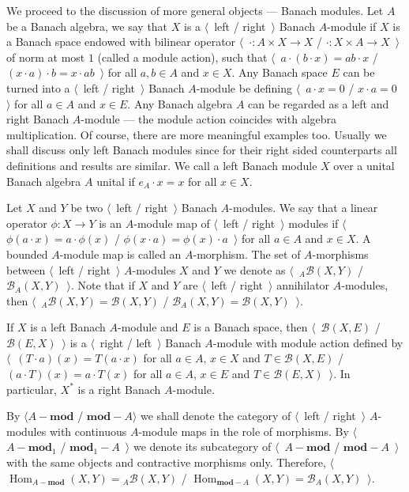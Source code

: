 We proceed to the discussion of more general objects --- Banach modules. Let $A$
be a Banach algebra, we say that $X$ is a $\langle$~left / right~$\rangle$
Banach $A$-module if $X$ is a Banach space endowed with bilinear operator
$\langle$~$\cdot:A\times X\to X$ / $\cdot: X\times A\to X$~$\rangle$ of norm at
most $1$ (called a module action), such that 
$\langle$~$a\cdot(b\cdot x)=ab\cdot x$ / 
$(x\cdot a)\cdot b=x\cdot ab$~$\rangle$ for all $a,b\in A$ and $x\in X$.
Any Banach space $E$ can be turned into a $\langle$~left / right~$\rangle$
Banach $A$-module be defining $\langle$~$a\cdot x=0$ / $x\cdot a=0$~$\rangle$
for all $a\in A$ and $x\in E$. Any Banach algebra $A$ can be regarded as a left
and right Banach $A$-module --- the module action coincides with algebra
multiplication. Of course, there are more meaningful examples too.  Usually we
shall discuss only left Banach modules since for their right sided counterparts
all definitions and results are similar. We call a left Banach module $X$ over a 
unital Banach algebra $A$ unital if $e_A\cdot x=x$ for all $x\in X$. 

Let $X$ and $Y$ be two $\langle$~left / right~$\rangle$ Banach $A$-modules. We say
that a linear operator $\phi:X\to Y$ is an $A$-module map of $\langle$~left /
right~$\rangle$ modules if $\langle$~$\phi(a\cdot x)=a\cdot \phi(x)$ /
$\phi(x\cdot a)=\phi(x)\cdot a$~$\rangle$ for all $a\in A$ and $x\in X$. A
bounded $A$-module map is called an $A$-morphism. The set of $A$-morphisms
between $\langle$~left / right~$\rangle$ $A$-modules $X$ and $Y$ we denote as
$\langle$~${}_A\mathcal{B}(X,Y)$ / $\mathcal{B}_A(X,Y)$~$\rangle$. Note that if
$X$ and $Y$ are $\langle$~left / right~$\rangle$ annihilator $A$-modules, then
$\langle$~${}_A\mathcal{B}(X,Y)=\mathcal{B}(X,Y)$ /
$\mathcal{B}_A(X,Y)=\mathcal{B}(X,Y)$~$\rangle$.

If $X$ is a left Banach $A$-module and $E$ is a
Banach space, then $\langle$~$\mathcal{B}(X,E)$ / $\mathcal{B}(E,X)$~$\rangle$
is a $\langle$~right / left~$\rangle$ Banach $A$-module with module action
defined by $\langle$~$(T\cdot a)(x)=T(a\cdot x)$ for all $a\in A$, $x\in X$ and
$T\in\mathcal{B}(X, E)$ / $(a\cdot T)(x)=a\cdot T(x)$ for all $a\in A$, $x\in E$
and $T\in\mathcal{B}(E, X)$~$\rangle$. In particular, $X^*$ is a right Banach
$A$-module.

By $\langle A-\mathbf{mod}$ / $\mathbf{mod}-A\rangle$ we shall denote the
category of $\langle$~left / right~$\rangle$ $A$-modules with continuous
$A$-module maps in the role of morphisms. By $\langle$~$A-\mathbf{mod}_1$ /
$\mathbf{mod}_1-A$~$\rangle$ we denote its subcategory of
$\langle$~$A-\mathbf{mod}$ / $\mathbf{mod}-A$~$\rangle$ with the same objects
and contractive morphisms only. Therefore,
$\langle$~$\operatorname{Hom}_{A-\mathbf{mod}}(X,Y)={}_A\mathcal{B}(X,Y)$ /
$\operatorname{Hom}_{\mathbf{mod}-A}(X,Y)=\mathcal{B}_A(X,Y)$~$\rangle$. 

